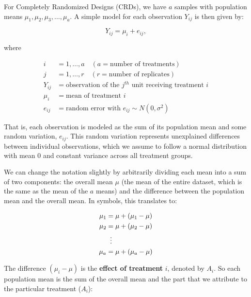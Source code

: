 \documentclass[
  letterpaper,
  DIV=11,
  numbers=noendperiod,
  oneside]{scrreprt}
\begin{document}
For Completely Randomized Designs (CRDs), we have \(a\) samples with
population means \(\mu_1, \mu_2, \mu_3, \ldots, \mu_a\). A simple model
for each observation \(Y_{ij}\) is then given by:

\[
Y_{ij} = \mu_{i} + e_{ij},
\]

where

\[
\begin{aligned}
i & = 1, \dots, a \quad (a = \text{number of treatments}) \\
j & = 1, \dots, r \quad (r = \text{number of replicates}) \\
Y_{ij} & = \text{observation of the } j^{th} \text{ unit receiving treatment } i \\
\mu_i & = \text{mean of treatment } i \\
e_{ij} & = \text{random error with } e_{ij} \sim N(0, \sigma^2)
\end{aligned}
\]

That is, each observation is modeled as the sum of its population mean
and some random variation, \(e_{ij}\). This random variation represents
unexplained differences between individual observations, which we assume
to follow a normal distribution with mean 0 and constant variance across
all treatment groups. 

We can change the notation slightly by arbitrarily dividing each mean
into a sum of two components: the overall mean \(\mu\) (the mean of the
entire dataset, which is the same as the mean of the \(a\)
means) and the difference
between the population mean and the overall mean. In symbols, this
translates to:

\begin{equation}
\begin{aligned}
\mu_1 &= \mu + (\mu_1 - \mu) \\
\mu_2 &= \mu + (\mu_2 - \mu) \\
&\;\;\vdots \notag \\
\mu_a &= \mu + (\mu_a - \mu)
\end{aligned}
\end{equation}

The difference \((\mu_i - \mu)\) is the \textbf{effect of treatment}
\(i\), denoted by \(A_i\). So each population mean is the sum of the
overall mean and the part that we attribute to the particular treatment
(\(A_i\)):
\end{document}
